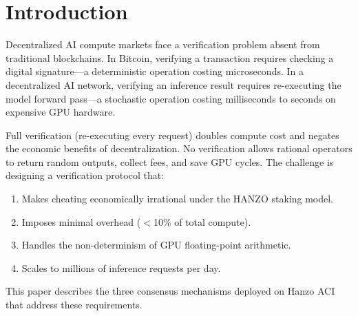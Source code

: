 \section{Introduction}

\label{sec:intro}

Decentralized AI compute markets face a verification problem absent from
traditional blockchains. In Bitcoin, verifying a transaction requires checking a
digital signature---a deterministic operation costing microseconds. In a
decentralized AI network, verifying an inference result requires re-executing
the model forward pass---a stochastic operation costing milliseconds to seconds
on expensive GPU hardware.

Full verification (re-executing every request) doubles compute cost and negates
the economic benefits of decentralization. No verification allows rational
operators to return random outputs, collect fees, and save GPU cycles. The
challenge is designing a verification protocol that:

\begin{enumerate}[leftmargin=1.4em]
    \item Makes cheating economically irrational under the HANZO staking model.
    \item Imposes minimal overhead ($<$10\% of total compute).
    \item Handles the non-determinism of GPU floating-point arithmetic.
    \item Scales to millions of inference requests per day.
\end{enumerate}

This paper describes the three consensus mechanisms deployed on Hanzo
ACI~\cite{hanzoaci} that address these requirements.

